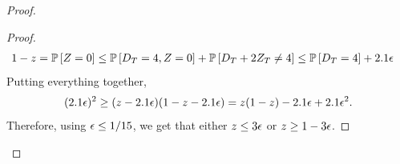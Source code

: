 \begin{proof}
\begin{proof}
\begin{align*}
&	1-z={\mathbb{P}}\left[Z=0\right] \leq {\mathbb{P}}\left[D_T=4,Z=0\right]+{\mathbb{P}}\left[D_T+2Z_T\neq 4\right] \leq {\mathbb{P}}\left[D_T=4\right] + 2.1 {\epsilon}
	\end{align*}
Putting everything together,
	$$(2.1{\epsilon})^2 \geq (z-2.1{\epsilon})(1-z-2.1{\epsilon})=z(1-z)-2.1{\epsilon} + 2.1{\epsilon}^2.$$
	Therefore, using ${\epsilon}\leq 1/15$, we get that either $z\leq 3{\epsilon}$ or $z\geq 1-3{\epsilon}$.
\end{proof}
%

\end{proof}
